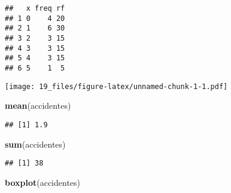 \documentclass[
]{article}
\newenvironment{Shaded}{\begin{snugshade}}{\end{snugshade}}
\newcommand{\DataTypeTok}[1]{\textcolor[rgb]{0.13,0.29,0.53}{#1}}
\newcommand{\DecValTok}[1]{\textcolor[rgb]{0.00,0.00,0.81}{#1}}
\newcommand{\KeywordTok}[1]{\textcolor[rgb]{0.13,0.29,0.53}{\textbf{#1}}}
\newcommand{\NormalTok}[1]{#1}
\newcommand{\OperatorTok}[1]{\textcolor[rgb]{0.81,0.36,0.00}{\textbf{#1}}}
\newcommand{\StringTok}[1]{\textcolor[rgb]{0.31,0.60,0.02}{#1}}
\begin{document}
\begin{Shaded}
\end{Shaded}

\begin{verbatim}
##   x freq rf
## 1 0    4 20
## 2 1    6 30
## 3 2    3 15
## 4 3    3 15
## 5 4    3 15
## 6 5    1  5
\end{verbatim}

\begin{Shaded}
\end{Shaded}

\texttt{[image: 19\_files/figure-latex/unnamed-chunk-1-1.pdf]}

\begin{Shaded}
\begin{Highlighting}[]
\KeywordTok{mean}\NormalTok{(accidentes)}
\end{Highlighting}
\end{Shaded}

\begin{verbatim}
## [1] 1.9
\end{verbatim}

\begin{Shaded}
\begin{Highlighting}[]
\KeywordTok{sum}\NormalTok{(accidentes)}
\end{Highlighting}
\end{Shaded}

\begin{verbatim}
## [1] 38
\end{verbatim}

\begin{Shaded}
\begin{Highlighting}[]
\KeywordTok{boxplot}\NormalTok{(accidentes)}
\end{Highlighting}
\end{Shaded}
\end{document}
